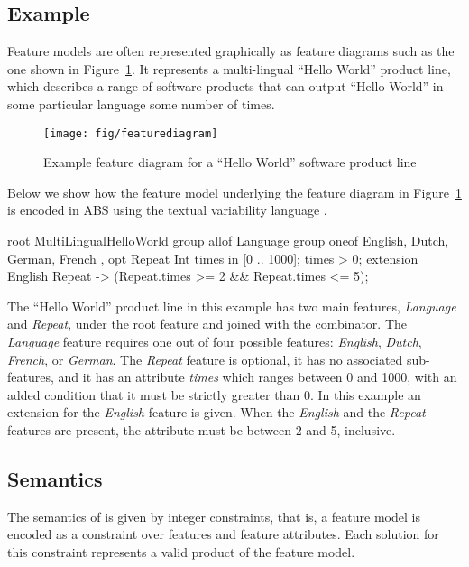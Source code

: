 \subsection{Example}
\label{sec:feature model example}
Feature models are often represented graphically as feature diagrams such as the
one shown in Figure~\ref{fig:feature diagram}.  It represents a multi-lingual
``Hello World'' product line, which describes a range of software products that
can output ``Hello World'' in some particular language some number of times.
\begin{figure}[ht]
    \centering \texttt{[image: fig/featurediagram]}
    \caption{Example feature diagram for a ``Hello World'' software product line}
    \label{fig:feature diagram}
\end{figure}
%
Below we show how the feature model underlying the feature diagram in
Figure~\ref{fig:feature diagram} is encoded in ABS using the textual variability
language \muTVL.
\begin{abscode}
root MultiLingualHelloWorld {
  group allof {
    Language {
      group oneof { English, Dutch, German, French }  
    },
    opt Repeat {
      Int times in [0 .. 1000];
      times > 0; 
    }
  } 
}
extension English {
  Repeat -> (Repeat.times >= 2 && Repeat.times <= 5);
}
\end{abscode}

The ``Hello World'' product line in this example has two main features,
\emph{Language} and \emph{Repeat}, under the root feature and joined with the
 combinator. The \emph{Language} feature requires one out of
four possible features: \emph{English}, \emph{Dutch}, \emph{French}, or
\emph{German}. The \emph{Repeat} feature is optional, it has no associated
sub-features, and it has an attribute \emph{times} which ranges between 0 and
1000, with an added condition that it must be strictly greater than 0. In this
example an extension for the \emph{English} feature is given. When the
\emph{English} and the \emph{Repeat} features are present, the attribute
 must be between 2 and 5, inclusive.


\subsection{Semantics}

The semantics of \muTVL is given by integer constraints, that is, a feature
model is encoded as a constraint over features and feature attributes. Each
solution for this constraint represents a valid product of the feature model.


